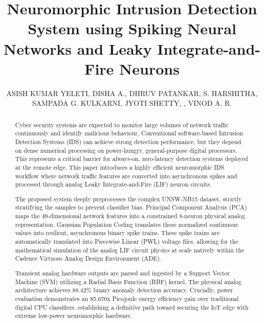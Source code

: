 \documentclass{ieeeaccess}
\begin{document}
\pagestyle{fancy}
\thispagestyle{fancy}

\title{Neuromorphic Intrusion Detection System using Spiking Neural Networks and Leaky Integrate-and-Fire Neurons}
\author{
\uppercase{Asish Kumar Yeleti},
\uppercase{Disha A.},
\uppercase{Dhruv Patankar},
\uppercase{S. Harshitha},
\uppercase{Sampada G. Kulkarni},
\uppercase{Jyoti Shetty}, ,
\uppercase{Vinod A. R.}
}

\address[1]{Department of Information Science and Engineering, RV College of Engineering, Bengaluru 560059, India}
\address[2]{Department of Artificial Intelligence and Machine Learning, RV College of Engineering, Bengaluru 560059, India}
\address[3]{Department of Computer Science and Engineering, RV College of Engineering, Bengaluru 560059, India}
\address[4]{Department of Civil Engineering, RV College of Engineering, Bengaluru 560059, India}


\begin{abstract}
Cyber security systems are expected to monitor large volumes of network traffic continuously and identify malicious behaviour. Conventional software-based Intrusion Detection Systems (IDS) can achieve strong detection performance, but they depend on dense numerical processing on power-hungry, general-purpose digital processors. This represents a critical barrier for always-on, zero-latency detection systems deployed at the remote edge. This paper introduces a highly efficient neuromorphic IDS workflow where network traffic features are converted into asynchronous spikes and processed through analog Leaky Integrate-and-Fire (LIF) neuron circuits. 

The proposed system deeply preprocesses the complex UNSW-NB15 dataset, strictly stratifying the samples to prevent classifier bias. Principal Component Analysis (PCA) maps the 49-dimensional network features into a constrained 8-neuron physical analog representation. Gaussian Population Coding translates these normalized continuous values into resilient, asynchronous binary spike trains. These spike trains are automatically translated into Piecewise Linear (PWL) voltage files, allowing for the mathematical simulation of the analog LIF circuit physics at scale natively within the Cadence Virtuoso Analog Design Environment (ADE).

Transient analog hardware outputs are parsed and ingested by a Support Vector Machine (SVM) utilizing a Radial Basis Function (RBF) kernel. The physical analog architecture achieves 88.42\% binary anomaly detection accuracy. Crucially, power evaluation demonstrates an 85,670x Picojoule energy efficiency gain over traditional digital CPU classifiers, establishing a definitive path toward securing the IoT edge with extreme low-power neuromorphic hardware.
\end{abstract}
\end{document}
